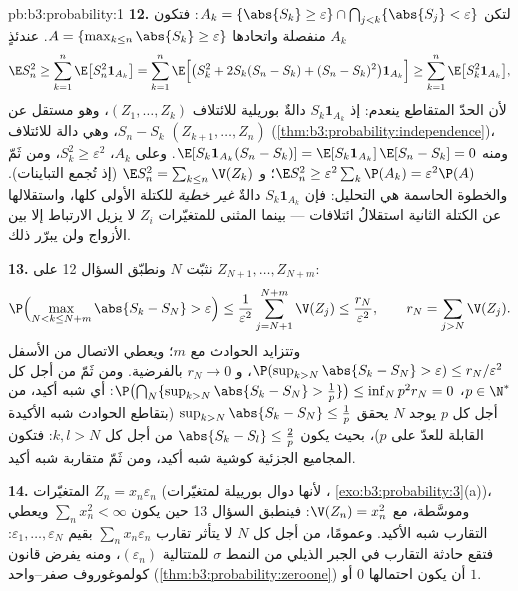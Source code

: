 \begin{solution}{pb:b3:probability:1}
\textbf{12.} لتكن $A_k = \{\abs{S_k} \geq \varepsilon\} \cap
\bigcap_{j<k}\{\abs{S_j} < \varepsilon\}$: فتكون $A_k$ منفصلة واتحادها $A = \{\max_{k\leq n}\abs{S_k} \geq
\varepsilon\}$.
عندئذٍ
\[
\E S_n^2 \geq \sum_{k=1}^n\E\bigl[S_n^2\mathbf 1_{A_k}\bigr]
= \sum_{k=1}^n\E\Bigl[\bigl(S_k^2 + 2S_k(S_n - S_k) + (S_n
- S_k)^2\bigr)\mathbf 1_{A_k}\Bigr]
\geq \sum_{k=1}^n\E\bigl[S_k^2\mathbf 1_{A_k}\bigr],
\]
لأن الحدّ المتقاطع ينعدم: إذ $S_k\mathbf 1_{A_k}$ دالةٌ بوريلية للائتلاف
$(Z_1, \dots, Z_k)$، وهو مستقل عن $S_n - S_k$، وهي دالة للائتلاف $(Z_{k+1},
\dots, Z_n)$
(\cref{thm:b3:probability:independence})، ومنه $\E[S_k\mathbf 1_{A_k}(S_n - S_k)] = \E[S_k\mathbf
1_{A_k}]\,\E[S_n - S_k] = 0$. وعلى $A_k$، $S_k^2 \geq
\varepsilon^2$، ومن ثَمّ
$\E S_n^2 \geq
\varepsilon^2\sum_k\P(A_k) = \varepsilon^2\P(A)$؛ و $\E
S_n^2 = \sum_{k\leq n}\V(Z_k)$ (إذ تُجمع التباينات). والخطوة الحاسمة هي
التحليل: فإن $S_k\mathbf 1_{A_k}$ دالةٌ \emph{غير خطية} للكتلة الأولى كلها،
واستقلالها عن الكتلة الثانية استقلالُ ائتلافات --- بينما
 المثنى للمتغيّرات $Z_i$ لا يزيل الارتباط إلا بين
الأزواج ولن يبرّر ذلك.

\textbf{13.} نثبّت $N$ ونطبّق السؤال 12 على $Z_{N+1},
\dots, Z_{N+m}$:
\[
\P\Bigl(\max_{N < k \leq N+m}\abs{S_k - S_N} >
\varepsilon\Bigr) \leq
\frac1{\varepsilon^2}\sum_{j=N+1}^{N+m}\V(Z_j) \leq
\frac{r_N}{\varepsilon^2},
\qquad r_N = \sum_{j>N}\V(Z_j) .
\]
وتتزايد الحوادث مع $m$؛ ويعطي الاتصال من الأسفل $\P(\sup_{k>N}\abs{S_k - S_N} > \varepsilon) \leq
r_N/\varepsilon^2$،
و $r_N \to 0$ بالفرضية. ومن ثَمّ من أجل كل $p \in \N^*$،
$\P\bigl(\bigcap_N\{\sup_{k>N}
\abs{S_k - S_N} > \frac1p\}\bigr) \leq \inf_Np^2r_N = 0$: أي شبه أكيد، من أجل كل $p$ يوجد $N$ يحقق $\sup_{k>N}\abs{S_k - S_N} \leq \frac1p$
(بتقاطع الحوادث شبه الأكيدة القابلة للعدّ على $p$)، بحيث يكون
$\abs{S_k -
S_l} \leq \frac2p$ من أجل كل $k, l > N$: فتكون المجاميع الجزئية كوشية شبه
أكيد، ومن ثَمّ متقاربة شبه أكيد.

\textbf{14.} المتغيّرات $Z_n = x_n\varepsilon_n$  (لأنها دوال بورييلة
لمتغيّرات ، \cref{exo:b3:probability:3}(a))، وموسَّطة، مع $\V(Z_n) =
x_n^2$: فينطبق
السؤال 13 حين يكون $\sum_nx_n^2 < \infty$ ويعطي التقارب شبه الأكيد. وعمومًا،
من أجل كل $N$ لا يتأثر تقارب $\sum_nx_n\varepsilon_n$ بقيم $\varepsilon_1, \dots, \varepsilon_N$: فتقع حادثة
التقارب في الجبر الذيلي من النمط $\sigma$ للمتتالية 
$(\varepsilon_n)$، ومنه يفرض قانون كولموغوروف صفر--واحد (\cref{thm:b3:probability:zeroone}) أن
يكون احتمالها $0$ أو $1$.


\end{solution}
